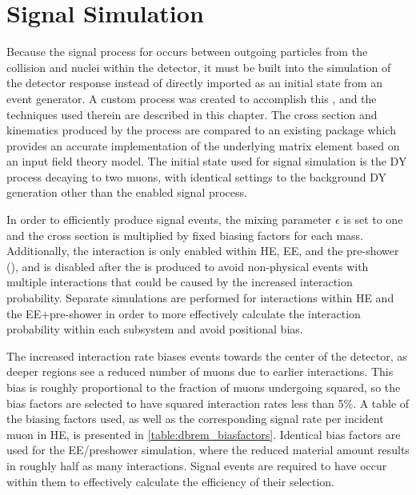 \chapter{Signal Simulation}
Because the signal process for \dbrem occurs between outgoing particles from the collision and nuclei within the detector, it must be built into the \gf simulation of the detector response instead of directly imported as an initial state from an event generator. A custom process was created to accomplish this \cite{Eichlersmith_2023}, and the techniques used therein are described in this chapter. The cross section and kinematics produced by the process are compared to an existing \mg package \cite{madgraph_2014, darkgauge} which provides an accurate implementation of the underlying matrix element based on an input field theory model.
The initial state used for signal simulation is the DY process decaying to two muons, with identical settings to the background DY generation other than the enabled signal process. 

In order to efficiently produce signal events, the mixing parameter $\epsilon$ is set to one and the cross section is multiplied by fixed biasing factors for each \aprime mass. 
Additionally, the interaction is only enabled within HE, EE, and the pre-shower (), and is disabled after the \aprime is produced to avoid non-physical events with multiple \dbrem interactions that could be caused by the increased interaction probability.
Separate simulations are performed for interactions within HE and the EE+pre-shower in order to more effectively calculate the interaction probability within each subsystem and avoid positional bias.

The increased interaction rate biases events towards the center of the detector, as deeper regions see a reduced number of muons due to earlier \dbrem interactions.
This bias is roughly proportional to the fraction of muons undergoing \dbrem squared, so the bias factors are selected to have squared interaction rates less than 5$\%$. 
A table of the biasing factors used, as well as the corresponding signal rate per incident muon in HE, is presented in \cref{table:dbrem_biasfactors}.
Identical bias factors are used for the EE/preshower simulation, where the reduced material amount results in roughly half as many \dbrem interactions.
Signal events are required to have \dbrem occur within them to effectively calculate the efficiency of their selection.

